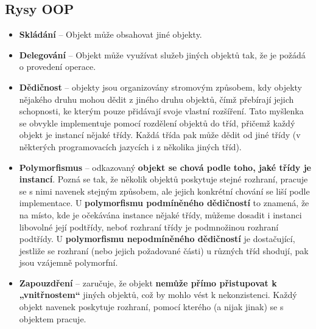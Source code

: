 \subsection{Rysy OOP}
\begin{itemize}
\item \textbf{Skládání} -- Objekt může obsahovat jiné objekty.
\item \textbf{Delegování} -- Objekt může využívat služeb jiných objektů tak, že je požádá o provedení operace.
\item \textbf{Dědičnost} -- objekty jsou organizovány stromovým způsobem, kdy objekty nějakého druhu mohou dědit z jiného druhu objektů, čímž přebírají jejich schopnosti, ke kterým pouze přidávají svoje vlastní rozšíření. Tato myšlenka se obvykle implementuje pomocí rozdělení objektů do tříd, přičemž každý objekt je instancí nějaké třídy. Každá třída pak může dědit od jiné třídy (v některých programovacích jazycích i z několika jiných tříd).
\item \textbf{Polymorfismus} -- odkazovaný\textbf{ objekt se chová podle toho, jaké třídy je instancí}. Pozná se tak, že několik objektů poskytuje stejné rozhraní, pracuje se s nimi navenek stejným způsobem, ale jejich konkrétní chování se liší podle implementace. U \textbf{polymorfismu podmíněného dědičností} to znamená, že na místo, kde je očekávána instance nějaké třídy, můžeme dosadit i instanci libovolné její podtřídy, neboť rozhraní třídy je podmnožinou rozhraní podtřídy. U \textbf{polymorfismu nepodmíněného dědičností} je dostačující, jestliže se rozhraní (nebo jejich požadované části) u různých tříd shodují, pak jsou vzájemně polymorfní.
\item \textbf{Zapouzdření} -- zaručuje, že objekt \textbf{nemůže přímo přistupovat k „vnitřnostem“} jiných objektů, což by mohlo vést k nekonzistenci. Každý objekt navenek poskytuje rozhraní, pomocí kterého (a nijak jinak) se s objektem pracuje.
\end{itemize}